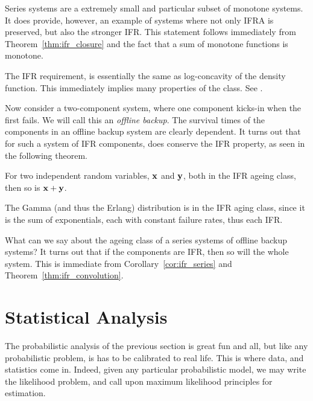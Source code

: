 \begin{cor}
\label{cor:ifr_series}
Series systems are a extremely small and particular subset of monotone systems.
It does provide, however, an example of systems where not only IFRA is preserved, but also the stronger IFR.
This statement follows immediately from Theorem~\ref{thm:ifr_closure} and the fact that a sum of monotone functions is monotone.
\end{cor}


\begin{extra}
The IFR requirement, is essentially the same as log-concavity of the density function.
This immediately implies many properties of the class.
See \cite{bagnoli_log-concave_2005}.
\end{extra}




Now consider a two-component system, where one component kicks-in when the first fails.
We will call this an \emph{offline backup}.
The survival times of the components in an offline backup system are clearly dependent. 
It turns out that for such a system of IFR components, does conserve the IFR property, as seen in the following theorem.
\begin{theorem}
\label{thm:ifr_convolution}
For two independent random variables, $\mathbf{x}$ and $\mathbf{y}$, both in the IFR ageing class, then so is $\mathbf{x}+\mathbf{y}$.
\end{theorem}



\begin{example}
The Gamma (and thus the Erlang) distribution is in the IFR aging class, since it is the sum of exponentials, each with constant failure rates, thus each IFR.
\end{example}

\begin{example}
What can we say about the ageing class of a series systems of offline backup systems? 
It turns out that if the components are IFR, then so will the whole system.
This is immediate from Corollary~\ref{cor:ifr_series} and Theorem~\ref{thm:ifr_convolution}.
\end{example}






\section{Statistical Analysis}
The probabilistic analysis of the previous section is great fun and all, but like any probabilistic problem, is has to be calibrated to real life. 
This is where data, and statistics come in.
Indeed, given any particular probabilistic model, we may write the likelihood problem, and call upon maximum likelihood principles for estimation.

